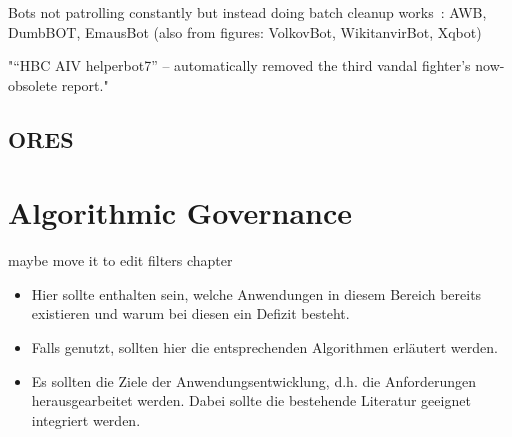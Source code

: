 Bots not patrolling constantly but instead doing batch cleanup works~\cite{GeiHal2013}:
AWB, DumbBOT, EmausBot
(also from figures: VolkovBot, WikitanvirBot, Xqbot)

\cite{GeiRib2010}
"“HBC AIV helperbot7” – automatically
removed the third vandal fighter's now-obsolete report."

\subsection{ORES}


\section{Algorithmic Governance}

maybe move it to edit filters chapter

\begin{itemize}
    \item Hier sollte enthalten sein, welche Anwendungen in diesem Bereich bereits existieren und warum bei diesen ein Defizit besteht.
    \item Falls genutzt, sollten hier die entsprechenden Algorithmen erläutert werden.
    \item Es sollten die Ziele der Anwendungsentwicklung, d.h. die Anforderungen herausgearbeitet werden. Dabei sollte die bestehende Literatur geeignet integriert werden.
\end{itemize}
